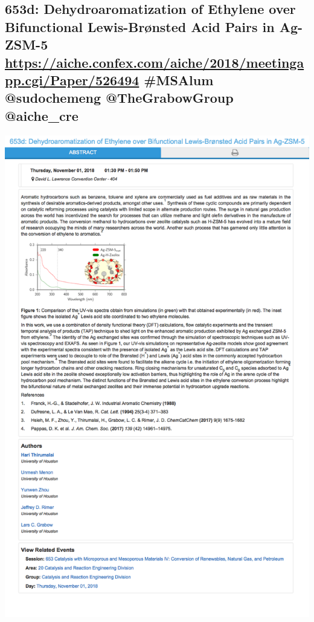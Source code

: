 \documentclass[11pt]{article}
\begin{document}
\subsection{653d: Dehydroaromatization of Ethylene over Bifunctional Lewis-Brønsted Acid Pairs in Ag-ZSM-5 \url{https://aiche.confex.com/aiche/2018/meetingapp.cgi/Paper/526494} \#MSAlum @sudochemeng @TheGrabowGroup @aiche\_cre}
\label{sec:orga48e403}
\begin{center}
\includegraphics[width=.9\linewidth]{./526494.png}
\end{center}
\end{document}
